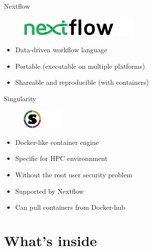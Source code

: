 \documentclass[usepdftitle=false]{beamer}
\begin{document}
\begin{frame}{Nextflow}
	\begin{figure}
		\includegraphics[height=1cm]{pictures/nextflow.png}
		\includegraphics[height=1cm]{pictures/blank}
	\end{figure}
	\begin{itemize}
		\item Data-driven workflow language
		\pause
		\item Portable (executable on multiple platforms)
		\pause
		\item Shareable and reproducible (with containers)
	\end{itemize}
	\vfill
\end{frame}

\begin{frame}{Singularity}
	\begin{figure}
		\includegraphics[height=1cm]{pictures/Singularity_logo}
		\includegraphics[height=1cm]{pictures/blank}
	\end{figure}
	\begin{itemize}
		\item Docker-like container engine
		\item Specific for HPC environnment
		\pause
		\item Without the root user security problem
		\pause
		\item Supported by Nextflow
		\pause
		\item Can pull containers from Docker-hub
	\end{itemize}
\end{frame}

\section{What's inside}
\end{document}
